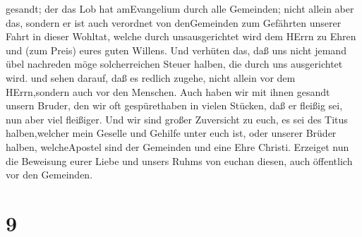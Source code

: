 gesandt; der das Lob hat amEvangelium durch alle Gemeinden;
 nicht allein aber das, sondern er ist auch verordnet von
denGemeinden zum Gefährten unserer Fahrt in dieser Wohltat, welche durch
unsausgerichtet wird dem HErrn zu Ehren und (zum Preis) eures guten
Willens.  Und verhüten das, daß uns nicht jemand übel
nachreden möge solcherreichen Steuer halben, die durch uns ausgerichtet
wird.  und sehen darauf, daß es redlich zugehe, nicht
allein vor dem HErrn,sondern auch vor den Menschen.  Auch
haben wir mit ihnen gesandt unsern Bruder, den wir oft gespürethaben in
vielen Stücken, daß er fleißig sei, nun aber viel fleißiger.
 Und wir sind großer Zuversicht zu euch, es sei des Titus
halben,welcher mein Geselle und Gehilfe unter euch ist, oder unserer
Brüder halben, welcheApostel sind der Gemeinden und eine Ehre Christi.
 Erzeiget nun die Beweisung eurer Liebe und unsers Ruhms
von euchan diesen, auch öffentlich vor den Gemeinden.

\hypertarget{section-8}{%
\section{9}\label{section-8}}

